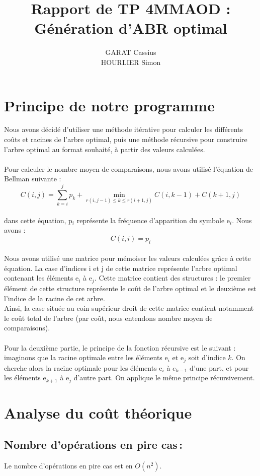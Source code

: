 \documentclass[a4paper, 10pt, french]{article}
\title{Rapport de TP 4MMAOD : Génération d'ABR optimal}
\author{
GARAT Cassius 
\\ HOURLIER Simon
}
\begin{document}
\maketitle

\section{Principe de notre  programme}
Nous avons décidé d'utiliser une méthode itérative pour calculer les différents coûts et racines de l'arbre optimal, puis une méthode récursive pour construire l'arbre optimal au format souhaité, à partir des valeurs calculées.\\ \\
Pour calculer le nombre moyen de comparaisons, nous avons utilisé l'équation de Bellman suivante :
$$C(i, j) = \sum_{k = i}^{j}p_k + \min_{r(i, j-1)  \leq  k  \leq r(i+1, j)} C(i, k-1) + C(k+1, j)$$\\
dans cette équation, p$_i$ représente la fréquence d'apparition du symbole e$_i$. Nous avons : 
$$C(i,i) = p_i $$\\

Nous avons utilisé une matrice pour mémoiser les valeurs calculées grâce à cette équation. La case d'indices i et j de cette matrice représente l'arbre optimal contenant les éléments e$_i$ à e$_j$. Cette matrice contient des structures : le premier élément de cette structure représente le coût de l'arbre optimal et le deuxième est l'indice de la racine de cet arbre.\\
Ainsi, la case située au coin supérieur droit de cette matrice contient notamment le coût total de l'arbre (par coût, nous entendons nombre moyen de comparaisons).\\ \\

Pour la deuxième partie, le principe de la fonction récursive est le suivant : imaginons que la racine optimale entre les éléments e$_i$ et e$_j$ soit d'indice $k$. On cherche alors la racine optimale pour les éléments e$_i$ à $e_{k-1}$ d'une part, et pour les éléments e$_{k+1}$ à e$_j$ d'autre part. On applique le même principe récursivement. 

\section{Analyse du coût théorique}

  \subsection{Nombre  d'opérations en pire cas\,: }
  Le nombre d'opérations en pire cas est en $O(n^2)$.
\end{document}
